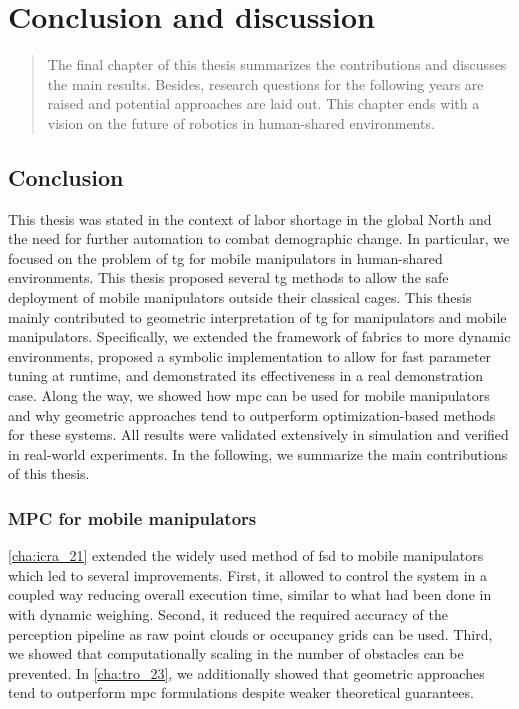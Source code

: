\chapter{Conclusion and discussion}
\label{cha:conclusion}

\begin{abstract}
The final chapter of this thesis summarizes the contributions and discusses the
main results. Besides, research questions for the following years are raised and
potential approaches are laid out. This chapter ends with a vision on the
future of robotics in human-shared environments.
\end{abstract}

\newpage

\section{Conclusion}
\label{sec:conclusion}

This thesis was stated in the context of labor shortage in the global North and
the need for further automation to combat demographic change. In particular, we
focused on the problem of \ac{tg} for mobile manipulators in human-shared
environments. This thesis proposed several \ac{tg} methods to allow the safe
deployment of mobile manipulators outside their classical cages.
This thesis mainly contributed to geometric interpretation of \ac{tg} for
manipulators and mobile manipulators. Specifically, we extended the framework of
\ac{fabrics} to more dynamic environments, proposed a symbolic implementation to
allow for fast parameter tuning at runtime, and demonstrated its effectiveness
in a real demonstration case. Along the way, we showed how \ac{mpc} can be used
for mobile manipulators and why geometric approaches tend to outperform
optimization-based methods for these systems. All results were validated
extensively in simulation and verified in real-world experiments. In the
following, we summarize the main contributions of this thesis.

\subsection{MPC for mobile manipulators}
\label{sec:conclusion_mpc}

\cref{cha:icra_21} extended the widely used method of \ac{fsd} to mobile
manipulators which led to several improvements. First, it allowed to control
the system in a coupled way reducing overall execution time, similar to what had
been done in \cite{Avanzini2018} with dynamic weighing. Second, it reduced the
required accuracy of the perception pipeline as raw point clouds or occupancy
grids can be used. Third, we showed that computationally scaling in the number
of obstacles can be prevented. In \cref{cha:tro_23},
we additionally showed that geometric approaches tend to outperform \ac{mpc}
formulations despite weaker theoretical guarantees.

